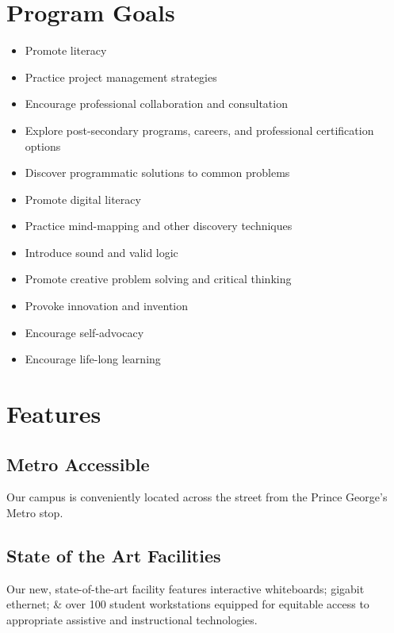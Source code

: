 \documentclass[letterpaper,10pt,english]{sphinxmanual}
\begin{document}
\section{Program Goals}
\label{description:program-goals}\begin{itemize}
\item {} 
Promote literacy

\item {} 
Practice project management strategies

\item {} 
Encourage professional collaboration and consultation

\item {} 
Explore post-secondary programs, careers, and professional certification options

\item {} 
Discover programmatic solutions to common problems

\item {} 
Promote digital literacy

\item {} 
Practice mind-mapping and other discovery techniques

\item {} 
Introduce sound and valid logic

\item {} 
Promote creative problem solving and critical thinking

\item {} 
Provoke innovation and invention

\item {} 
Encourage self-advocacy

\item {} 
Encourage life-long learning

\end{itemize}


\section{Features}
\label{description:features}

\subsection{Metro Accessible}
\label{description:metro-accessible}
Our campus is conveniently located across the street from the Prince George's Metro stop.


\subsection{State of the Art Facilities}
\label{description:state-of-the-art-facilities}
Our new, state-of-the-art facility features interactive whiteboards; gigabit ethernet; \& over 100 student workstations equipped for equitable access to appropriate assistive and instructional technologies.
\end{document}
